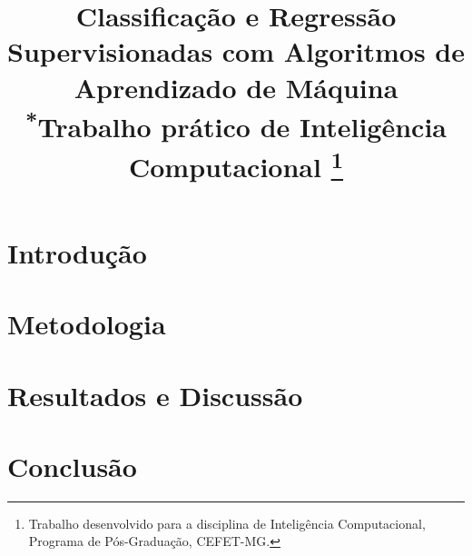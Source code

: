 \documentclass[conference]{IEEEtran}
\begin{document}
\title{Classificação e Regressão Supervisionadas com Algoritmos de Aprendizado de Máquina\\
{\footnotesize \textsuperscript{*}Trabalho prático de Inteligência Computacional}
\thanks{Trabalho desenvolvido para a disciplina de Inteligência Computacional, Programa de Pós-Graduação, CEFET-MG.}
}

\author{
}

\maketitle

\renewcommand{\abstractname}{Resumo}
\begin{abstract}

\end{abstract}

\renewcommand{\IEEEkeywordsname}{Palavras-chave}
\begin{IEEEkeywords}

\end{IEEEkeywords}

\section{Introdução}



\section{Metodologia}


\section{Resultados e Discussão}


\section{Conclusão}


\renewcommand{\refname}{Referências}


\end{document}
